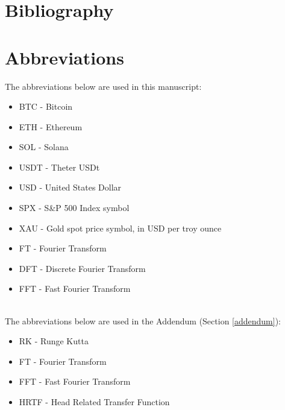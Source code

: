 \documentclass[a4paper, 10pt, conference]{ieeeconf}      %
\begin{document}
\newpage
\section{Bibliography}


\section{Abbreviations}
The abbreviations below are used in this manuscript:
\begin{itemize}
    \item BTC - Bitcoin
    \item ETH - Ethereum
    \item SOL - Solana
    \item USDT - Theter USDt
    \item USD - United States Dollar
    \item SPX - S\&P 500 Index symbol
    \item XAU - Gold spot price symbol, in USD per troy ounce
    \item FT - Fourier Transform
    \item DFT - Discrete Fourier Transform
    \item FFT - Fast Fourier Transform
\end{itemize}
\\
The abbreviations below are used in the Addendum (Section \ref{addendum}):
\begin{itemize}
    \item RK - Runge Kutta
    \item FT - Fourier Transform
    \item FFT - Fast Fourier Transform
    \item HRTF - Head Related Transfer Function
\end{itemize}
\end{document}

